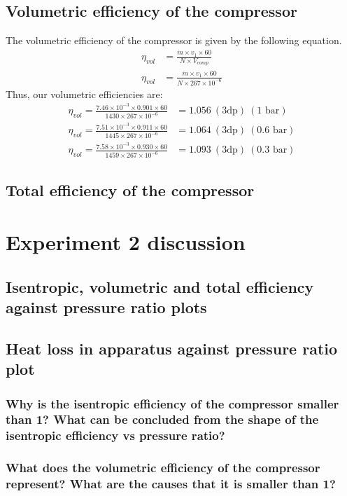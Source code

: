 \documentclass[class=article, crop=false, 12pt,a4paper]{standalone}
\numberwithin{equation}{section}
\begin{document}
\subsection{Volumetric efficiency of the compressor}
The volumetric efficiency of the compressor is given by the following equation.
\begin{align}
  \eta_{vol} &= \frac{\dot{m}\times v_1 \times 60}{N \times V_{comp}}\\
  \eta_{vol} &= \frac{\dot{m}\times v_1 \times 60}{N \times 267 \times 10^{-6}}
\end{align}
Thus, our volumetric efficiencies are:
\begin{align}
  \eta_{vol} = \frac{7.46\times 10^{-3} \times 0.901 \times 60}{1430 \times 267 \times 10^{-6}} &= 1.056 \ (3\textrm{dp}) \ (1 \textrm{ bar})\\
  \eta_{vol} = \frac{7.51\times 10^{-3}\times 0.911 \times 60}{1445 \times 267 \times 10^{-6}} &= 1.064 \ (3\textrm{dp}) \ (0.6 \textrm{ bar})\\
  \eta_{vol} = \frac{7.58\times 10^{-3}\times 0.930 \times 60}{1459 \times 267 \times 10^{-6}} &= 1.093 \ (3\textrm{dp}) \ (0.3 \textrm{ bar})
\end{align}
\subsection{Total efficiency of the compressor}
\section{Experiment 2 discussion}
\subsection{Isentropic, volumetric and total efficiency against pressure ratio plots}
\subsection{Heat loss in apparatus against pressure ratio plot}
\subsubsection{Why is the isentropic efficiency of the compressor smaller than 1? What can be concluded from the shape of the isentropic efficiency vs pressure ratio?}
\subsubsection{What does the volumetric efficiency of the compressor represent? What are the causes that it is smaller than 1?}
\end{document}
